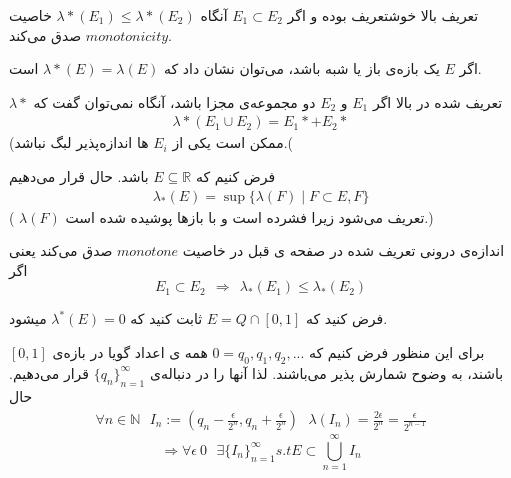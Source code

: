 \begin{remark}[\bf تمرین]
تعریف بالا خوشتعریف بوده و اگر
$ E_1 \subset E_2 $
آنگاه 
$ {\lambda}*(E_1) \leq {\lambda}*(E_2) $
خاصیت 
$ monotonicity $ 
صدق می‌کند.

\end{remark}
\begin{remark}
اگر 
$E$
یک بازه‌ی باز یا شبه باشد، می‌توان نشان داد که 
$ {\lambda}*(E) = \lambda(E) $
است.
\end{remark}
\begin{remark}
$ {\lambda}* $
تعریف شده در بالا اگر 
$ E_1 $
و 
$ E_2 $
دو مجموعه‌ی مجزا باشد، آنگاه نمی‌توان گفت که 
\begin{align}
{\lambda}*(E_{1} \cup E_{2}) = {E_1}* + {E_2}* \nonumber
\end{align}
(ممکن است یکی از 
$ E_i $
ها اندازه‌پذیر لبگ نباشد.(
\end{remark}
\begin{definition}
فرض کنیم که 
$ E \subseteq \mathbb{R} $
باشد. حال قرار می‌دهیم
\begin{align}
{\lambda}_*(E) = \sup \lbrace \lambda(F) \mid F \subset E ,  F \rbrace \nonumber
\end{align}
(
$ \lambda(F) $
تعریف می‌شود زیرا فشرده است و با بازها پوشیده شده است.)
\end{definition}
\begin{remark}
اندازه‌ی درونی تعریف شده در صفحه ی قبل در خاصیت 
$ monotone $
صدق می‌کند یعنی اگر 
\begin{equation*}
E_1 \subset E_2 \ \ \Rightarrow \ \ {\lambda}_*(E_1) \leq {\lambda}_*(E_2)
\end{equation*}
\end{remark}
\begin{example}
فرض کنید که 
$ E = Q \cap [0, 1] $
ثابت کنید که 
$ {\lambda}^*(E) = 0 $
میشود.
\end{example}
برای این منظور فرض کنیم که
$ 0 = q_{0}, q_{1}, q_{2}, ... $
همه ی اعداد گویا در بازه‌ی 
$ [0, 1] $
باشند، به وضوح شمارش پذیر می‌باشند. لذا آنها را در دنباله‌ی 
$ {\lbrace q_n \rbrace}_{n = 1}^{\infty} $
قرار می‌دهیم. حال 
\begin{align}
\forall n \in \mathbb{N} \ \ \ I_n := (q_n - \frac{\epsilon}{2^n}, q_n + \frac{\epsilon}{2^n}) \ \ \ \lambda(I_n) = \frac{2 \epsilon}{2^n} = \frac{\epsilon}{2^{n - 1}} \nonumber
\end{align}
\begin{equation*}
\Rightarrow \forall \epsilon \> 0  \ \ \ \exists {\lbrace I_n \rbrace}_{n = 1}^{\infty}  s.t  E \subset \bigcup_{n = 1}^{\infty} I_n 
\end{equation*}
